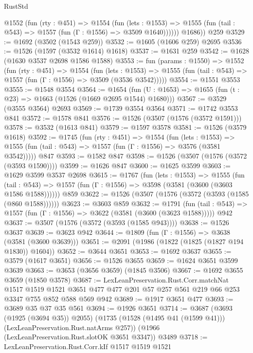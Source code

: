 \begin{lexlean}{RustStd}
\begin{coremodule}
          @1552
            (fun (rty : @451) =>
            @1554
              (fun (lets : @1553) =>
              @1555 (fun (tail : @543) => @1557 (fun (Γ : @1556) => @3509 @1640))))))
        @1686))
    @259
@3529 := @1692 (@3502 (@1543 @259))
@3532 := @1605 (@1606 @259) @2695
@3536 := @1526 (@1597 (@3532 @1614) @1618)
@3537 := @1631 @259
@3542 := @1628 (@1630 @3537 @2698 @1586 @1588)
@3553 := fun (params : @1550) =>
  @1552
    (fun (rty : @451) =>
    @1554
      (fun (lets : @1553) =>
      @1555 (fun (tail : @543) => @1557 (fun (Γ : @1556) => @3509 (@3536 @3542)))))
@3554 := @1551 @3553
@3555 := @1548 @3554
@3564 := @1654 (fun (U : @1653) => @1655 (fun (t : @23) => @1663 (@1526 (@1669 @2695 @1544) @1680)))
@3567 := @3529 (@3555 @3564) @2693
@3569 := @1739 @3554 @3564
@3571 := @1742 @3553 @841
@3572 := @1578 @841
@3576 := @1526 (@3507 (@1576 (@3572 @1591)))
@3578 := @3532 (@1613 @841)
@3579 := @1597 @3578
@3581 := @1526 (@3579 @1618)
@3592 := @1745
    (fun (rty : @451) =>
    @1554
      (fun (lets : @1553) =>
      @1555 (fun (tail : @543) => @1557 (fun (Γ : @1556) => @3576 (@3581 @3542)))))
    @847
@3593 := @1582 @847
@3598 := @1526 (@3507 (@1576 (@3572 (@3593 @1590))))
@3599 := @1626 @847
@3600 := @1625 @3599
@3603 := @1629 @3599 @3537 @2698
@3615 := @1767
    (fun (lets : @1553) =>
    @1555
      (fun (tail : @543) => @1557 (fun (Γ : @1556) => @3598 (@3581 (@3600 (@3603 @1586 @1588))))))
    @859
@3622 := @1526 (@3507 (@1576 (@3572 (@3593 (@1585 (@860 @1588))))))
@3623 := @3603 @859
@3632 := @1791
    (fun (tail : @543) => @1557 (fun (Γ : @1556) => @3622 (@3581 (@3600 (@3623 @1588)))))
    @942
@3637 := @3507 (@1576 (@3572 (@3593 (@1585 @943))))
@3638 := @1526 @3637
@3639 := @3623 @942
@3644 := @1809 (fun (Γ : @1556) => @3638 (@3581 (@3600 @3639)))
@3651 := @2091 (@1986 (@1822 (@1825 (@1827 @194 @1830)) @1604))
@3652 := @3644 @3651
@3653 := @1692 @3637
@3655 := @3579 (@1617 @3651)
@3656 := @1526 @3655
@3659 := @1624 @3651 @3599 @3639
@3663 := @3653 (@3656 @3659) (@1845 @3506)
@3667 := @1692 @3655 @3659 (@1850 @3578)
@3687 := LexLeanPreservation.Rust.Corr.matchNat
    @1517
    @1519
    @1521
    @3651
    @477
    @477
    @201
    @57
    @257
    @561
    @219
    @66
    @253
    @3347
    @755
    @852
    @588
    @569
    @942
@3689 := @1917 @3651 @477
@3693 := @3689 @35 @37 @35 @561
@3694 := @1926 @3651
@3714 := @3687
    (@3693 (@1925 (@3694 @35)) @2055)
    (@1735 (@1528 (@1495 @41 (@1599 @41))) (LexLeanPreservation.Rust.natArms @257))
    (@1966 (LexLeanPreservation.Rust.slotOK @3651 @3347))
    @3489
@3718 := LexLeanPreservation.Rust.Corr.kIf @1517 @1519 @1521

\end{coremodule}
\end{lexlean}
